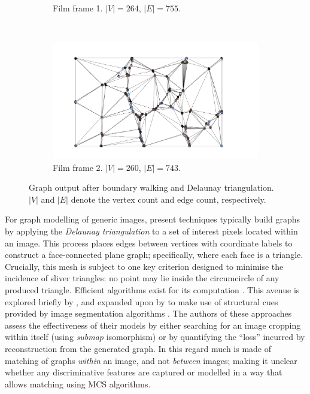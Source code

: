 \documentclass{mpaper}
\begin{document}
\begin{figure}
\begin{subfigure}[b]{0.22\textwidth}
		\caption{
				Film frame 1.
				$|V|=264$, $|E|=755$.
		}
		\label{fig:explor-ff1graph}
	\end{subfigure}
	~
	\begin{subfigure}[b]{0.22\textwidth}
		\includegraphics[width=\textwidth]{img-results/gbu-smr3-graph}
		\caption{
				Film frame 2.
				$|V|=260$, $|E|=743$.
		}
		\label{fig:explor-ff2graph}
	\end{subfigure}
	
	\vspace{0.5em}
	
	\caption{
		Graph output after boundary walking and Delaunay triangulation.
		$|V|$ and $|E|$ denote the vertex count and edge count, respectively.
	}
\end{figure}

For graph modelling of generic images, present techniques typically build graphs by applying the \emph{Delaunay triangulation} \cite{Delaunay} to a set of interest pixels located within an image.
This process places edges between vertices with coordinate labels to construct a face-connected plane graph; specifically, where each face is a triangle.
Crucially, this mesh is subject to one key criterion designed to minimise the incidence of sliver triangles: no point may lie inside the circumcircle of any produced triangle.
Efficient algorithms exist for its computation \cite{DelaunayAlgs,DelaunayModern}.
This avenue is explored briefly by \citeauthor{Submap-Iso-Images} \cite{Submap-Iso-Images}, and expanded upon by \citeauthor{Plane-Graphs-From-Images} to make use of structural cues provided by image segmentation algorithms \cite{Plane-Graphs-From-Images}.
The authors of these approaches assess the effectiveness of their models by either searching for an image cropping within itself (using \emph{submap} isomorphism) or by quantifying the ``loss'' incurred by reconstruction from the generated graph.
In this regard much is made of matching of graphs \emph{within} an image, and not \emph{between} images; making it unclear whether any discriminative features are captured or modelled in a way that allows matching using MCS algorithms.
\end{document}
